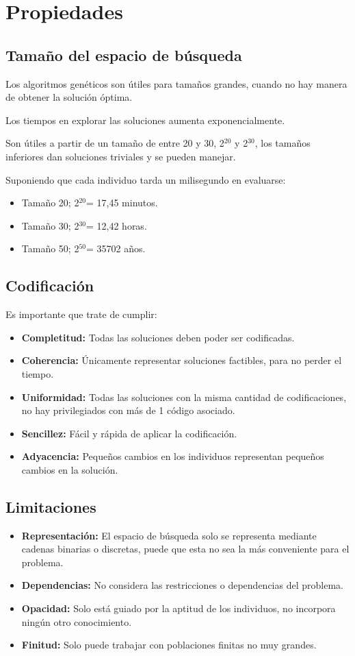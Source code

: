 \documentclass[12pt, twoside, openright]{report} %
\begin{document}
\section{Propiedades}
\subsection{Tamaño del espacio de búsqueda}
Los algoritmos genéticos son útiles para tamaños grandes, cuando no hay manera de obtener la solución óptima.

Los tiempos en explorar las soluciones aumenta exponencialmente.

Son útiles a partir de un tamaño de entre 20 y 30, 2$^{20}$ y 2$^{30}$, los tamaños inferiores dan soluciones triviales y se pueden manejar.

Suponiendo que cada individuo tarda un milisegundo en evaluarse:
\begin{itemize}
	\item Tamaño 20; 2$^{20}$= 17,45 minutos.
	\item Tamaño 30; 2$^{30}$= 12,42 horas.
	\item Tamaño 50; 2$^{50}$= 35702 años.
\end{itemize}

\subsection{Codificación}
Es importante que trate de cumplir:
\begin{itemize}
	\item \textbf{Completitud:} Todas las soluciones deben poder ser codificadas.
	\item \textbf{Coherencia:} Únicamente representar soluciones factibles, para no perder el tiempo.
	\item \textbf{Uniformidad:} Todas las soluciones con la misma cantidad de codificaciones, no hay privilegiados con más de 1 código asociado.
	\item \textbf{Sencillez:} Fácil y rápida de aplicar la codificación.
	\item \textbf{Adyacencia:} Pequeños cambios en los individuos representan pequeños cambios en  la solución.
\end{itemize}

\subsection{Limitaciones}
\begin{itemize}
	\item \textbf{Representación:} El espacio de búsqueda solo se representa mediante cadenas binarias o discretas, puede que esta no sea la más conveniente para el problema.
	\item \textbf{Dependencias:} No considera las restricciones o dependencias del problema.
	\item \textbf{Opacidad:} Solo está guiado por la aptitud de los individuos, no incorpora ningún otro conocimiento.
	\item \textbf{Finitud:} Solo puede trabajar con poblaciones finitas no muy grandes.
\end{itemize}
\end{document}
